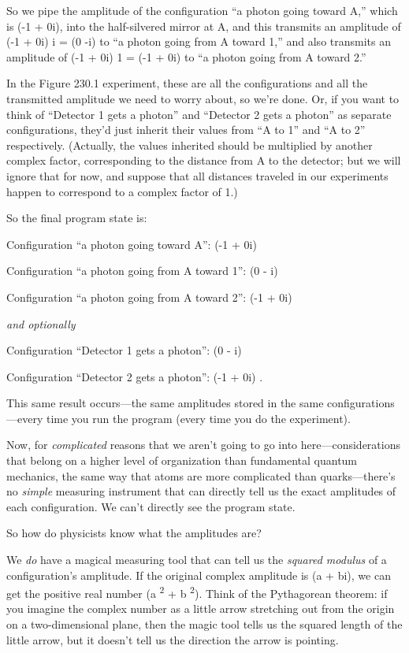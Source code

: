 {
 So we pipe the amplitude of the configuration ``a
photon going toward A,'' which is (-1 + 0i), into the
half-silvered mirror at A, and this transmits an amplitude of (-1 + 0i)
{\texttimes} i = (0 -i) to ``a photon going from A
toward 1,'' and also transmits an amplitude of (-1 +
0i) {\texttimes} 1 = (-1 + 0i) to ``a photon going
from A toward 2.''}

{
 In the Figure 230.1 experiment, these are all the configurations
and all the transmitted amplitude we need to worry about, so
we're done. Or, if you want to think of
``Detector 1 gets a photon'' and
``Detector 2 gets a photon'' as
separate configurations, they'd just inherit their
values from ``A to 1'' and
``A to 2'' respectively. (Actually,
the values inherited should be multiplied by another complex factor,
corresponding to the distance from A to the detector; but we will
ignore that for now, and suppose that all distances traveled in our
experiments happen to correspond to a complex factor of 1.)}

{
 So the final program state is:}

{
 Configuration ``a photon going toward
A'': (-1 + 0i)}

{
 Configuration ``a photon going from A toward
1'': (0 - i)}

{
 Configuration ``a photon going from A toward
2'': (-1 + 0i)}

{
 \textit{and optionally}}

{
 Configuration ``Detector 1 gets a
photon'': (0 - i)}

{
 Configuration ``Detector 2 gets a
photon'': (-1 + 0i) .}

{
 This same result occurs---the same amplitudes stored in the same
configurations---every time you run the program (every time you do the
experiment).}

{
 Now, for \textit{complicated} reasons that we
aren't going to go into here---considerations that
belong on a higher level of organization than fundamental quantum
mechanics, the same way that atoms are more complicated than
quarks---there's no \textit{simple} measuring
instrument that can directly tell us the exact amplitudes of each
configuration. We can't directly see the program
state.}

{
 So how do physicists know what the amplitudes are?}

{
 We \textit{do} have a magical measuring tool that can tell us the
\textit{squared modulus} of a configuration's
amplitude. If the original complex amplitude is (a + bi), we can get
the positive real number (a\textsuperscript{ 2} + b\textsuperscript{ 2}).
Think of the Pythagorean theorem: if you imagine the complex number as
a little arrow stretching out from the origin on a two-dimensional
plane, then the magic tool tells us the squared length of the little
arrow, but it doesn't tell us the direction the arrow
is pointing.}

